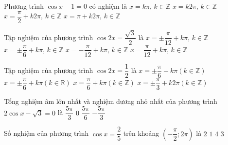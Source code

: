 \begin{ex}%
	Phương trình $\cos x-1=0$ có nghiệm là
	\choice
	{$x=k\pi, \, k\in \mathbb{Z}$}
	{\True $x=k2\pi, \, k\in \mathbb{Z}$}
	{$x=\dfrac{\pi}{2}+k2\pi, \, k\in \mathbb{Z}$}
	{$x=\pi +k2\pi, \, k\in \mathbb{Z}$}
\end{ex}
\begin{ex}%
	Tập nghiệm của phương trình $\cos 2x=\dfrac{\sqrt{3}}{2}$ là
	\choice
	{\True $x=\pm \dfrac{\pi}{12}+k\pi,\, k\in \mathbb{Z} $}
	{$x=\pm \dfrac{\pi}{6}+k\pi,\, k\in \mathbb{Z} $}
	{$x=-\dfrac{\pi}{12}+k\pi, \, k\in \mathbb{Z}$}
	{$x=\dfrac{\pi}{12}+k\pi, \, k\in \mathbb{Z}$}
\end{ex}
\begin{ex}%
	Tập nghiệm của phương trình $\cos 2x=\dfrac{1}{2}$ là
	\choice
	{\True $x=\pm \dfrac{\pi}{6}+k\pi \left(k\in \mathbb{Z}\right)$}
	{$x=\pm \dfrac{\pi}{6}+k\pi \left(k\in \mathbb{R}\right)$}
	{$x=\dfrac{\pi}{6}+k\pi \left(k\in \mathbb{Z}\right)$}
	{$x=\pm \dfrac{\pi}{3}+k2\pi \left(k\in \mathbb{Z}\right)$}
\end{ex}
\begin{ex}%
	Tổng nghiệm âm lớn nhất và nghiệm dương nhỏ nhất của phương trình $2\cos x-\sqrt{3}=0$ là
	\choice
	{$\dfrac{5\pi}{3}$}
	{\True $0$}
	{$\dfrac{5\pi}{6}$}
	{$-\dfrac{5\pi}{3}$}
\end{ex}
\begin{ex}%
	Số nghiệm của phương trình $\cos x=\dfrac{2}{5}$ trên khoảng $\left(-\dfrac{\pi}{2};2\pi\right)$ là
	\choice
	{\True $2$}
	{$1$}
	{$4$}
	{$3$}
\end{ex}

